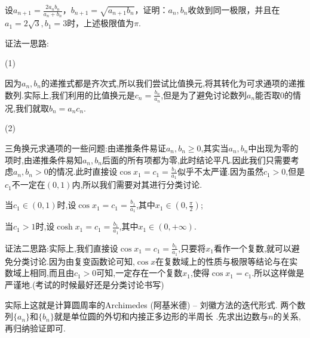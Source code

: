 \documentclass[../../main.tex]{subfiles}%
\begin{document}
\begin{example}\label{example-4.54112}
设\(a_{n + 1}=\frac{2a_nb_n}{a_n + b_n}\)，\(b_{n + 1}=\sqrt{a_{n + 1}b_n}\)，证明：\(a_n,b_n\)收敛到同一极限，并且在\(a_1 = 2\sqrt{3},b_1 = 3\)时，上述极限值为\(\pi\).
\end{example}
\begin{note}
{\color{blue}证法一思路:}

\hypertarget{比值换元的问题}{(1)}因为$a_n,b_n$的递推式都是齐次式,所以我们尝试比值换元,将其转化为可求通项的递推数列.实际上,我们利用的比值换元是$c_n=\frac{b_n}{a_n}$,但是为了避免讨论数列$a_n$能否取0的情况,我们就取$b_n=a_nc_n$.

\hypertarget{三角换元的问题}{(2)}三角换元求通项的一些问题:由递推条件易证$a_n,b_n\geqslant  0$,其实当$a_n,b_n$中出现为零的项时,由递推条件易知$a_n,b_n$后面的所有项都为零,此时结论平凡.因此我们只需要考虑$a_n,b_n>0$的情况.此时直接设\(\cos x_1 = c_1=\frac{b_1}{a_1}\)似乎不太严谨.因为虽然$c_1>0$,但是$c_1$不一定在$(0,1)$内,所以我们需要对其进行分类讨论.

当$c_1\in (0,1)$时,设\(\cos x_1 = c_1=\frac{b_1}{a_1}\),其中$x_1\in (0,\frac{\pi}{2})$;

当$c_1>1$时,设\(\cosh x_1 = c_1=\frac{b_1}{a_1}\),其中$x_1\in (0,+\infty)$.

{\color{blue}证法二思路:}实际上,我们直接设\(\cos x_1 = c_1=\frac{b_1}{a_1}\),只要将$x_1$看作一个复数,就可以避免分类讨论.因为由复变函数论可知,$\cos x$在复数域上的性质与极限等结论与在实数域上相同,而且由$c_1>0$可知,一定存在一个复数$x_1$,使得$\cos x_1=c_1$.所以这样做是严谨地.(考试的时候最好还是分类讨论书写)

实际上这就是计算圆周率的Archimedes (阿基米德) -- 刘徽方法的迭代形式. 两个数列$\{a_n\}$和$\{b_n\}$就是单位圆的外切和内接正多边形的半周长 .先求出边数与$n$的关系,再归纳验证即可.
\end{note}
\end{document}
